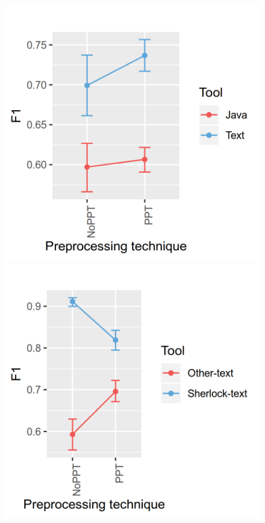\documentclass[a4paper, 12pt, oneside, openany, final, pdftex]{book}\usepackage[]{graphicx}\usepackage[]{color}
\makeatletter
\def\maxwidth{ %
  \ifdim\Gin@nat@width>\linewidth
    \linewidth
  \else
    \Gin@nat@width
  \fi
}
\makeatother
\begin{document}
\begin{appendices}
\begin{figure}[ht]\centering{} 
\includegraphics[width=\maxwidth]{figure/Figure-SOCO-INTERACTION-1} 
\label{fig:interaction- 1 for SOCO D1 }\endminipage\hfill {} 
\includegraphics[width=\maxwidth]{figure/Figure-SOCO-INTERACTION-2} 

\end{figure}
\end{appendices}
\end{document}

